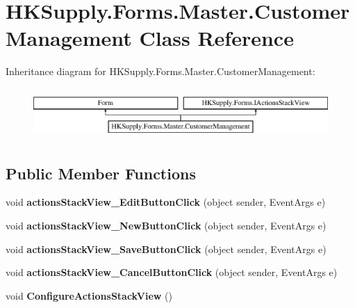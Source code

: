 \hypertarget{class_h_k_supply_1_1_forms_1_1_master_1_1_customer_management}{}\section{H\+K\+Supply.\+Forms.\+Master.\+Customer\+Management Class Reference}
\label{class_h_k_supply_1_1_forms_1_1_master_1_1_customer_management}
Inheritance diagram for H\+K\+Supply.\+Forms.\+Master.\+Customer\+Management\+:\begin{figure}[H]
\begin{center}
\leavevmode
\includegraphics[height=1.951219cm]{class_h_k_supply_1_1_forms_1_1_master_1_1_customer_management}
\end{center}
\end{figure}
\subsection*{Public Member Functions}
\begin{DoxyCompactItemize}
\item 
\mbox{\label{class_h_k_supply_1_1_forms_1_1_master_1_1_customer_management_a3f43cfeb43b387ecaed7c55e2e18e100}} 
void {\bfseries actions\+Stack\+View\+\_\+\+Edit\+Button\+Click} (object sender, Event\+Args e)
\item 
\mbox{\label{class_h_k_supply_1_1_forms_1_1_master_1_1_customer_management_abc0dcd4189499ba45709340d6fcead00}} 
void {\bfseries actions\+Stack\+View\+\_\+\+New\+Button\+Click} (object sender, Event\+Args e)
\item 
\mbox{\label{class_h_k_supply_1_1_forms_1_1_master_1_1_customer_management_a995afa91b41c02399fb9d20b5b20bbb9}} 
void {\bfseries actions\+Stack\+View\+\_\+\+Save\+Button\+Click} (object sender, Event\+Args e)
\item 
\mbox{\label{class_h_k_supply_1_1_forms_1_1_master_1_1_customer_management_aad8235c651699d44b7670e79d9ea9d7b}} 
void {\bfseries actions\+Stack\+View\+\_\+\+Cancel\+Button\+Click} (object sender, Event\+Args e)
\item 
\mbox{\label{class_h_k_supply_1_1_forms_1_1_master_1_1_customer_management_aeeb0dd460b047375cad59b4e6053636b}} 
void {\bfseries Configure\+Actions\+Stack\+View} ()
\end{DoxyCompactItemize}
